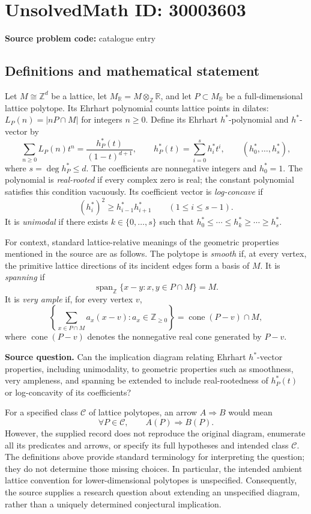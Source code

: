 \documentclass[11pt]{article}
\newcommand{\Z}{\mathbb{Z}}
\newcommand{\R}{\mathbb{R}}
\begin{document}
\section*{UnsolvedMath ID: 30003603}
\textbf{Source problem code:} catalogue entry
\subsection{Definitions and mathematical statement}
Let \(M\cong\Z^d\) be a lattice, let \(M_{\R}=M\otimes_{\Z}\R\), and let \(P\subset M_{\R}\) be a full-dimensional lattice polytope. Its Ehrhart polynomial counts lattice points in dilates: \(L_P(n)=|nP\cap M|\) for integers \(n\geq0\). Define its Ehrhart \(h^*\)-polynomial and \(h^*\)-vector by
\[
\sum_{n\geq0}L_P(n)t^n=\frac{h_P^*(t)}{(1-t)^{d+1}},\qquad h_P^*(t)=\sum_{i=0}^{s}h_i^*t^i,\qquad (h_0^*,\ldots,h_s^*),
\]
where \(s=\deg h_P^*\leq d\). The coefficients are nonnegative integers and \(h_0^*=1\). The polynomial is \emph{real-rooted} if every complex zero is real; the constant polynomial satisfies this condition vacuously. Its coefficient vector is \emph{log-concave} if
\[
(h_i^*)^2\geq h_{i-1}^*h_{i+1}^*\qquad(1\leq i\leq s-1).
\]
It is \emph{unimodal} if there exists \(k\in\{0,\ldots,s\}\) such that \(h_0^*\leq\cdots\leq h_k^*\geq\cdots\geq h_s^*\).

For context, standard lattice-relative meanings of the geometric properties mentioned in the source are as follows. The polytope is \emph{smooth} if, at every vertex, the primitive lattice directions of its incident edges form a basis of \(M\). It is \emph{spanning} if
\[
\operatorname{span}_{\Z}\{x-y:x,y\in P\cap M\}=M.
\]
It is \emph{very ample} if, for every vertex \(v\),
\[
\left\{\sum_{x\in P\cap M}a_x(x-v):a_x\in\Z_{\geq0}\right\}
=\operatorname{cone}(P-v)\cap M,
\]
where \(\operatorname{cone}(P-v)\) denotes the nonnegative real cone generated by \(P-v\).

\textbf{Source question.} Can the implication diagram relating Ehrhart \(h^*\)-vector properties, including unimodality, to geometric properties such as smoothness, very ampleness, and spanning be extended to include real-rootedness of \(h_P^*(t)\) or log-concavity of its coefficients?

For a specified class \(\mathcal C\) of lattice polytopes, an arrow \(A\Longrightarrow B\) would mean
\[
\forall P\in\mathcal C,\qquad A(P)\Longrightarrow B(P).
\]
However, the supplied record does not reproduce the original diagram, enumerate all its predicates and arrows, or specify its full hypotheses and intended class \(\mathcal C\). The definitions above provide standard terminology for interpreting the question; they do not determine those missing choices. In particular, the intended ambient lattice convention for lower-dimensional polytopes is unspecified. Consequently, the source supplies a research question about extending an unspecified diagram, rather than a uniquely determined conjectural implication.
\end{document}

